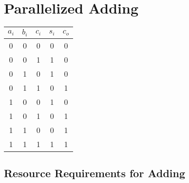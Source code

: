 \section{Parallelized Adding}
\label{sec:add}

\begin{tabular}{|c|c|c||c|c|}
\hline
$a_i$ & $b_i$ & $c_i$ & $s_i$ & $c_o$\\
\hline
0 & 0 & 0 & 0 & 0\\
0 & 0 & 1 & 1 & 0\\
0 & 1 & 0 & 1 & 0\\
0 & 1 & 1 & 0 & 1\\
1 & 0 & 0 & 1 & 0\\
1 & 0 & 1 & 0 & 1\\
1 & 1 & 0 & 0 & 1\\
1 & 1 & 1 & 1 & 1\\
\hline
\end{tabular}

\subsection{Resource Requirements for Adding}

